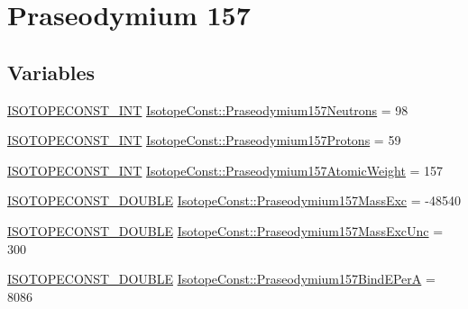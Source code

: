 \hypertarget{group___isotope_const-_praseodymium-_pr157}{}\section{Praseodymium 157}
\label{group___isotope_const-_praseodymium-_pr157}
\subsection*{Variables}
\begin{DoxyCompactItemize}
\item 
\mbox{\hyperlink{group___isotope_const-_macros_ga5f18360b3e99483a35c32d789e62621c}{I\+S\+O\+T\+O\+P\+E\+C\+O\+N\+S\+T\+\_\+\+I\+NT}} \mbox{\hyperlink{group___isotope_const-_praseodymium-_pr157_ga7c3a948fd53a490eca8f394595e952d9}{Isotope\+Const\+::\+Praseodymium157\+Neutrons}} = 98
\item 
\mbox{\hyperlink{group___isotope_const-_macros_ga5f18360b3e99483a35c32d789e62621c}{I\+S\+O\+T\+O\+P\+E\+C\+O\+N\+S\+T\+\_\+\+I\+NT}} \mbox{\hyperlink{group___isotope_const-_praseodymium-_pr157_gad174a9f2c85dab162deaf3e8c0cbc8b6}{Isotope\+Const\+::\+Praseodymium157\+Protons}} = 59
\item 
\mbox{\hyperlink{group___isotope_const-_macros_ga5f18360b3e99483a35c32d789e62621c}{I\+S\+O\+T\+O\+P\+E\+C\+O\+N\+S\+T\+\_\+\+I\+NT}} \mbox{\hyperlink{group___isotope_const-_praseodymium-_pr157_ga9c1c2c8e939c069738a68a961ae1eab7}{Isotope\+Const\+::\+Praseodymium157\+Atomic\+Weight}} = 157
\item 
\mbox{\hyperlink{group___isotope_const-_macros_ga8f45a7272ce02c0b4c65c44636ed719a}{I\+S\+O\+T\+O\+P\+E\+C\+O\+N\+S\+T\+\_\+\+D\+O\+U\+B\+LE}} \mbox{\hyperlink{group___isotope_const-_praseodymium-_pr157_ga03d18c3cc95d5371af4fee834433e99d}{Isotope\+Const\+::\+Praseodymium157\+Mass\+Exc}} = -\/48540
\item 
\mbox{\hyperlink{group___isotope_const-_macros_ga8f45a7272ce02c0b4c65c44636ed719a}{I\+S\+O\+T\+O\+P\+E\+C\+O\+N\+S\+T\+\_\+\+D\+O\+U\+B\+LE}} \mbox{\hyperlink{group___isotope_const-_praseodymium-_pr157_ga0b316557f9404877ff3e65afe2590d24}{Isotope\+Const\+::\+Praseodymium157\+Mass\+Exc\+Unc}} = 300
\item 
\mbox{\hyperlink{group___isotope_const-_macros_ga8f45a7272ce02c0b4c65c44636ed719a}{I\+S\+O\+T\+O\+P\+E\+C\+O\+N\+S\+T\+\_\+\+D\+O\+U\+B\+LE}} \mbox{\hyperlink{group___isotope_const-_praseodymium-_pr157_ga1ef342556169039d87dc2076ec0fbe32}{Isotope\+Const\+::\+Praseodymium157\+Bind\+E\+PerA}} = 8086

\end{DoxyCompactItemize}
